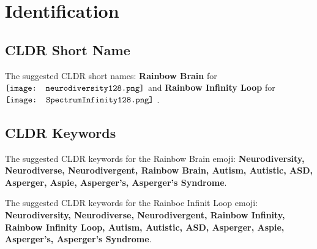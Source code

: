 \section{Identification}

\subsection{CLDR Short Name}
The suggested CLDR short names: \textbf{Rainbow Brain} for 
$\vcenter{\hbox{\texttt{[image: neurodiversity128.png]}}}$
and \textbf{Rainbow Infinity Loop} for
$\vcenter{\hbox{\texttt{[image: SpectrumInfinity128.png]}}}$
.


\subsection{CLDR Keywords}
The suggested CLDR keywords for the Rainbow Brain emoji: \textbf{Neurodiversity,
Neurodiverse,
Neurodivergent,
Rainbow Brain,
Autism,
Autistic,
ASD,
Asperger,
Aspie,
Asperger's,
Asperger's Syndrome}.

The suggested CLDR keywords for the Rainboe Infinit Loop emoji: \textbf{Neurodiversity,
Neurodiverse,
Neurodivergent,
Rainbow Infinity,
Rainbow Infinity Loop,
Autism,
Autistic,
ASD,
Asperger,
Aspie,
Asperger's,
Asperger's Syndrome}.
